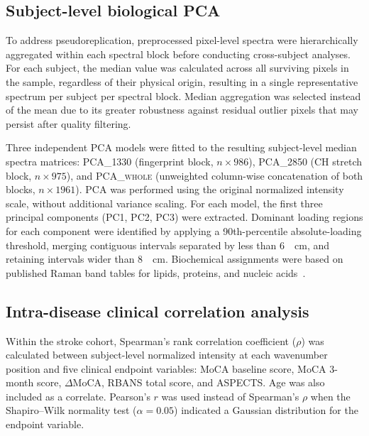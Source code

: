 \documentclass[preprint,12pt]{elsarticle}
\begin{document}
\subsection{Subject-level biological PCA}
\label{subsec:biopca}

To address pseudoreplication, preprocessed pixel-level spectra were hierarchically aggregated within each spectral block before conducting cross-subject analyses. For each subject, the median value was calculated across all surviving pixels in the sample, regardless of their physical origin, resulting in a single representative spectrum per subject per spectral block. Median aggregation was selected instead of the mean due to its greater robustness against residual outlier pixels that may persist after quality filtering.

Three independent PCA models were fitted to the resulting subject-level median spectra matrices: \textsc{PCA\_{1330}} (fingerprint block, $n \times 986$), \textsc{PCA\_{2850}} (C\textendash H stretch block, $n \times 975$), and \textsc{PCA\_{whole}} (unweighted column-wise concatenation of both blocks, $n \times 1961$). PCA was performed using the original normalized intensity scale, without additional variance scaling. For each model, the first three principal components (PC1, PC2, PC3) were extracted. Dominant loading regions for each component were identified by applying a 90th-percentile absolute-loading threshold, merging contiguous intervals separated by less than 6~\si{\per\centi\metre}, and retaining intervals wider than 8~\si{\per\centi\metre}. Biochemical assignments were based on published Raman band tables for lipids, proteins, and nucleic acids~\cite{kaminska2022,imanbekova2021}.

\subsection{Intra-disease clinical correlation analysis}
\label{subsec:correlation}

Within the stroke cohort, Spearman's rank correlation coefficient ($\rho$) was calculated between subject-level normalized intensity at each wavenumber position and five clinical endpoint variables: MoCA baseline score, MoCA 3-month score, $\Delta$MoCA, RBANS total score, and ASPECTS. Age was also included as a correlate. Pearson's $r$ was used instead of Spearman's $\rho$ when the Shapiro--Wilk normality test ($\alpha = 0.05$) indicated a Gaussian distribution for the endpoint variable.
\end{document}
